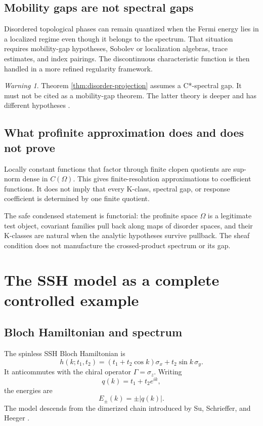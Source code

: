 \documentclass[12pt]{article}
\theoremstyle{definition}
\theoremstyle{remark}
\newtheorem{warning}[theorem]{Warning}
\begin{document}
\subsection{Mobility gaps are not spectral gaps}

Disordered topological phases can remain quantized when the Fermi energy lies
in a localized regime even though it belongs to the spectrum.
That situation requires mobility-gap hypotheses, Sobolev or localization
algebras, trace estimates, and index pairings.
The discontinuous characteristic function is then handled in a more refined
regularity framework.

\begin{warning}
Theorem \ref{thm:disorder-projection} assumes a C*-spectral gap.
It must not be cited as a mobility-gap theorem.
The latter theory is deeper and has different hypotheses
\cite{Bellissard1994,ProdanSchulzBaldes2016}.
\end{warning}

\subsection{What profinite approximation does and does not prove}

Locally constant functions that factor through finite clopen quotients are
sup-norm dense in $C(\Omega)$.
This gives finite-resolution approximations to coefficient functions.
It does not imply that every K-class, spectral gap, or response coefficient
is determined by one finite quotient.

The safe condensed statement is functorial:
the profinite space $\Omega$ is a legitimate test object, covariant families
pull back along maps of disorder spaces, and their K-classes are natural when
the analytic hypotheses survive pullback.
The sheaf condition does not manufacture the crossed-product spectrum or its
gap.

\section{The SSH model as a complete controlled example}
\label{sec:ssh}

\subsection{Bloch Hamiltonian and spectrum}

The spinless SSH Bloch Hamiltonian is
\[
h(k;t_1,t_2)
=
(t_1+t_2\cos k)\sigma_x
+t_2\sin k\,\sigma_y.
\]
It anticommutes with the chiral operator $\Gamma=\sigma_z$.
Writing
\[
q(k)=t_1+t_2e^{ik},
\]
the energies are
\[
E_{\pm}(k)=\pm|q(k)|.
\]
The model descends from the dimerized chain introduced by Su, Schrieffer, and
Heeger \cite{SSH1979}.
\end{document}
